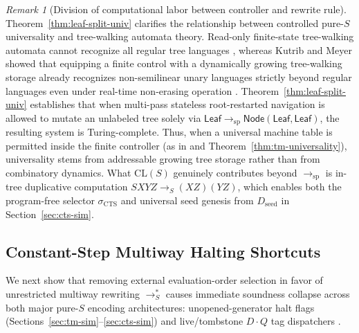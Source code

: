 \documentclass[11pt,reqno]{amsart}
\numberwithin{equation}{section}
\theoremstyle{plain}
\theoremstyle{definition}
\theoremstyle{remark}
\newtheorem{remark}[theorem]{Remark}
\newcommand{\CLS}{\mathrm{CL}(S)}
\newcommand{\redS}{\to_S}
\newcommand{\redSs}{\to_S^*}
\begin{document}
\begin{remark}[Division of computational labor between controller and rewrite rule]\label{rem:control-division}
Theorem~\ref{thm:leaf-split-univ} clarifies the relationship between controlled pure-$S$ universality and tree-walking automata theory. Read-only finite-state tree-walking automata cannot recognize all regular tree languages \cite{BojanczykColcombet2008}, whereas Kutrib and Meyer showed that equipping a finite control with a dynamically growing tree-walking storage already recognizes non-semilinear unary languages strictly beyond regular languages even under real-time non-erasing operation \cite{KutribMeyer2023,KutribMeyer2026}. Theorem~\ref{thm:leaf-split-univ} establishes that when multi-pass stateless root-restarted navigation is allowed to mutate an unlabeled tree solely via $\mathsf{Leaf} \to_{\mathrm{sp}} \mathsf{Node}(\mathsf{Leaf},\mathsf{Leaf})$, the resulting system is Turing-complete. Thus, when a universal machine table is permitted inside the finite controller (as in \cite{Filin2026} and Theorem~\ref{thm:tm-universality}), universality stems from addressable growing tree storage rather than from combinatory dynamics. What $\CLS$ genuinely contributes beyond $\to_{\mathrm{sp}}$ is in-tree duplicative computation $S X Y Z \redS (X Z)(Y Z)$, which enables both the program-free selector $\sigma_{\mathrm{CTS}}$ and universal seed genesis from $D_{\mathrm{seed}}$ in Section~\ref{sec:cts-sim}.
\end{remark}

\subsection{Constant-Step Multiway Halting Shortcuts}\label{subsec:multiway-shortcuts}

We next show that removing external evaluation-order selection in favor of unrestricted multiway rewriting $\redSs$ causes immediate soundness collapse across both major pure-$S$ encoding architectures: unopened-generator halt flags (Sections~\ref{sec:tm-sim}--\ref{sec:cts-sim}) and live/tombstone $D \cdot Q$ tag dispatchers \cite{Filin2026}.
\end{document}
